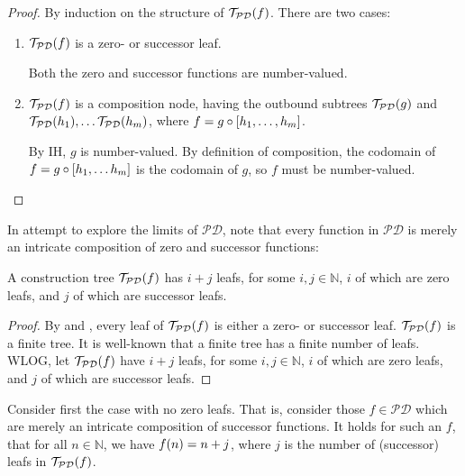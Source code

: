 \begin{proof} By induction on the structure of $\mathcal{T}_\mathcal{PD}{\mathopen{}\left({f}\right)\mathclose{}}$.
There are two cases:\begin{enumerate}[label=(\arabic*)]

\item $\mathcal{T}_\mathcal{PD}{\mathopen{}\left({f}\right)\mathclose{}}$ is a zero- or successor leaf.

Both the zero and successor functions are number-valued.

\item $\mathcal{T}_\mathcal{PD}{\mathopen{}\left({f}\right)\mathclose{}}$ is a composition node, having the
outbound subtrees $\mathcal{T}_\mathcal{PD}{\mathopen{}\left({g}\right)\mathclose{}}$ and
$\mathcal{T}_\mathcal{PD}{\mathopen{}\left({h_1}\right)\mathclose{}}, \ldots \mathcal{T}_\mathcal{PD}{\mathopen{}\left({h_m}\right)\mathclose{}}$,
where $f = g \circ \mathopen{}\left[{h_1, \ldots, h_m}\right]\mathclose{}$.

By IH, $g$ is number-valued. By definition of composition, the codomain of $f =
g \circ \mathopen{}\left[{h_1, \ldots h_m}\right]\mathclose{}$ is the codomain of $g$, so $f$ must be
number-valued.\end{enumerate}\end{proof}

In attempt to explore the limits of $\mathcal{PD}$, note that every function in
$\mathcal{PD}$ is merely an intricate composition of zero and successor
functions:

\begin{theorem} \label{thm:p-tree-leafs} A construction tree
$\mathcal{T}_\mathcal{PD}{\mathopen{}\left({f}\right)\mathclose{}}$ has $i+j$ leafs, for some $i,j \in \mathbb{N}$,
$i$ of which are zero leafs, and $j$ of which are successor leafs.
\end{theorem}

\begin{proof} By  and ,
every leaf of $\mathcal{T}_\mathcal{PD}{\mathopen{}\left({f}\right)\mathclose{}}$ is either a zero- or successor
leaf. $\mathcal{T}_\mathcal{PD}{\mathopen{}\left({f}\right)\mathclose{}}$ is a finite tree. It is well-known that a
finite tree has a finite number of leafs. WLOG, let
$\mathcal{T}_\mathcal{PD}{\mathopen{}\left({f}\right)\mathclose{}}$ have $i+j$ leafs, for some $i, j \in
\mathbb{N}$, $i$ of which are zero leafs, and $j$ of which are successor
leafs.\end{proof}

Consider first the case with no zero leafs. That is, consider those $f \in
\mathcal{PD}$ which are merely an intricate composition of successor functions.
It holds for such an $f$, that for all $n \in \mathbb{N}$, we have
$f{\mathopen{}\left({n}\right)\mathclose{}}=n+j$, where $j$ is the number of (successor) leafs in
$\mathcal{T}_\mathcal{PD}{\mathopen{}\left({f}\right)\mathclose{}}$.

